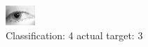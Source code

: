 \begin{figure}[h!]
\begin{center}
\includegraphics[width=0.60\columnwidth]{figures/ID1317_class_4_target_3.png}
\end{center}
\caption{ Classification: 4 actual target: 3}
\label{fig:ID1317_class_4_target_3}
\end{figure}
